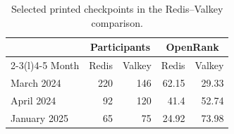 \begin{table}[tbp]
\caption{Selected printed checkpoints in the Redis--Valkey comparison.}
\label{tab:ch9-checkpoints}
\centering\small\renewcommand{\arraystretch}{1.16}
\begin{tabular*}{\linewidth}{@{}l@{\extracolsep{\fill}}rrrr@{}}\toprule
 & \multicolumn{2}{c}{Participants} & \multicolumn{2}{c}{OpenRank}\\
\cmidrule(lr){2-3}\cmidrule(l){4-5}
Month & Redis & Valkey & Redis & Valkey\\\midrule
March 2024 & 220 & 146 & 62.15 & 29.33\\
April 2024 & 92 & 120 & 41.4 & 52.74\\
January 2025 & 65 & 75 & 24.92 & 73.98\\\bottomrule
\end{tabular*}
\end{table}
